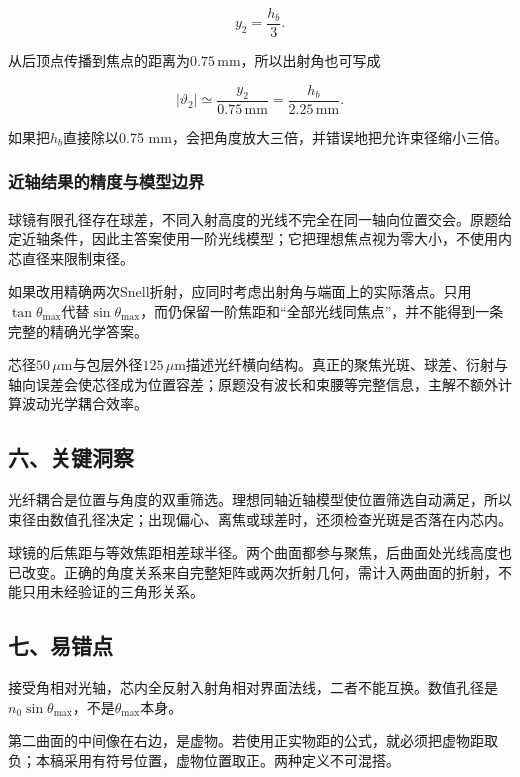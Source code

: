 \documentclass[12pt,a4paper,fontset=fandol]{ctexart}
\begin{document}
\[
y_2=\frac{h_b}{3}.
\]

从后顶点传播到焦点的距离为\(0.75\,\mathrm{mm}\)，所以出射角也可写成

\[
|\vartheta_2|
\simeq\frac{y_2}{0.75\,\mathrm{mm}}
=\frac{h_b}{2.25\,\mathrm{mm}}.
\]

如果把\(h_b\)直接除以0.75
mm，会把角度放大三倍，并错误地把允许束径缩小三倍。

\subsubsection{近轴结果的精度与模型边界}\label{ux8fd1ux8f74ux7ed3ux679cux7684ux7cbeux5ea6ux4e0eux6a21ux578bux8fb9ux754c}

球镜有限孔径存在球差，不同入射高度的光线不完全在同一轴向位置交会。原题给定近轴条件，因此主答案使用一阶光线模型；它把理想焦点视为零大小，不使用内芯直径来限制束径。

如果改用精确两次Snell折射，应同时考虑出射角与端面上的实际落点。只用\(\tan\theta_{\max}\)代替\(\sin\theta_{\max}\)，而仍保留一阶焦距和``全部光线同焦点''，并不能得到一条完整的精确光学答案。

芯径\(50\,\mu\mathrm m\)与包层外径\(125\,\mu\mathrm m\)描述光纤横向结构。真正的聚焦光斑、球差、衍射与轴向误差会使芯径成为位置容差；原题没有波长和束腰等完整信息，主解不额外计算波动光学耦合效率。

\subsection{六、关键洞察}\label{ux516dux5173ux952eux6d1eux5bdf-4}

光纤耦合是位置与角度的双重筛选。理想同轴近轴模型使位置筛选自动满足，所以束径由数值孔径决定；出现偏心、离焦或球差时，还须检查光斑是否落在内芯内。

球镜的后焦距与等效焦距相差球半径。两个曲面都参与聚焦，后曲面处光线高度也已改变。正确的角度关系来自完整矩阵或两次折射几何，需计入两曲面的折射，不能只用未经验证的三角形关系。

\subsection{七、易错点}\label{ux4e03ux6613ux9519ux70b9-4}

接受角相对光轴，芯内全反射入射角相对界面法线，二者不能互换。数值孔径是\(n_0\sin\theta_{\max}\)，不是\(\theta_{\max}\)本身。

第二曲面的中间像在右边，是虚物。若使用正实物距的公式，就必须把虚物距取负；本稿采用有符号位置，虚物位置取正。两种定义不可混搭。
\end{document}
